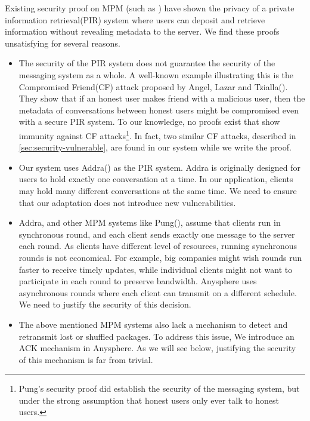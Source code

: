 Existing security proof on MPM (such as \cite{corrigan2010dissent, corrigan2015riposte, angel2016unobservable, ahmad2021addra}) have shown the privacy of a private information retrieval(PIR) system where users can deposit and retrieve information without revealing metadata to the server. We find these proofs unsatisfying for several reasons.
\begin{itemize}
    \item The security of the PIR system does not guarantee the security of the messaging system as a whole. A well-known example illustrating this is the Compromised Friend(CF) attack proposed by Angel, Lazar and Tzialla(\cite{angel2018cf}). They show that if an honest user makes friend with a malicious user, then the metadata of conversations between honest users might be compromised even with a secure PIR system. To our knowledge, no proofs exist that show immunity against CF attacks\footnote{Pung's security proof \cite[Appendix C]{angel2018thesis} did establish the security of the messaging system, but under the strong assumption that honest users only ever talk to honest users.}. In fact, two similar CF attacks, described in \cref{sec:security-vulnerable}, are found in our system while we write the proof. 
    
    \item Our system uses Addra(\cite{ahmad2021addra}) as the PIR system. Addra is originally designed for users to hold exactly one conversation at a time. In our application, clients may hold many different conversations at the same time. We need to ensure that our adaptation does not introduce new vulnerabilities.
    
    \item Addra, and other MPM systems like Pung(\cite{angel2016unobservable}), assume that clients run in synchronous round, and each client sends exactly one message to the server each round. As clients have different level of resources, running synchronous rounds is not economical. For example, big companies might wish rounds run faster to receive timely updates, while individual clients might not want to participate in each round to preserve bandwidth. Anysphere uses asynchronous rounds where each client can transmit on a different schedule. We need to justify the security of this decision.
    
    \item The above mentioned MPM systems also lack a mechanism to detect and retransmit lost or shuffled packages. To address this issue, We introduce an ACK mechanism in Anysphere. As we will see below, justifying the security of this mechanism is far from trivial.
\end{itemize}

